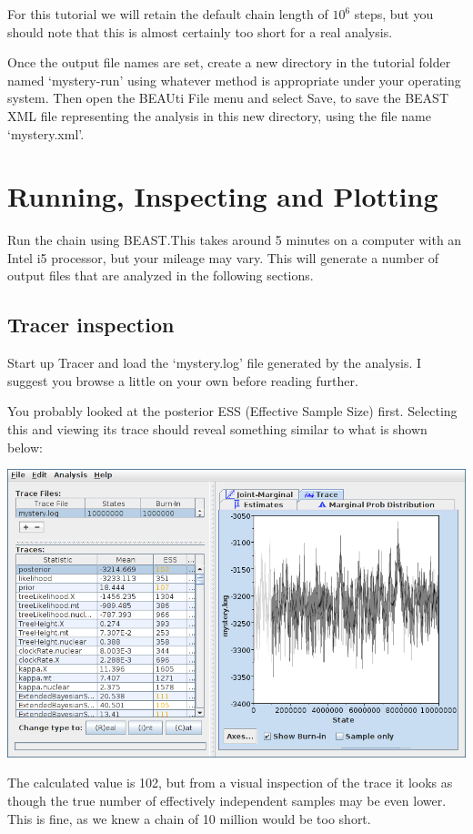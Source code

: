 \documentclass[a4paper,11pt]{article}
\begin{document}
For this tutorial we will retain the default chain length of $10^6$ steps, but
you should note that this is almost certainly too short for a real analysis.


Once the output file names are set, create a new directory in the tutorial
folder named `mystery-run' using whatever method is appropriate under your
operating system.  Then open the BEAUti File menu and select Save, to save the
BEAST XML file representing the analysis in this new directory, using the file
name `mystery.xml'.

\section{Running, Inspecting and Plotting}

Run the chain using BEAST.\@ This takes around 5 minutes on a computer with an
Intel i5 processor, but your mileage may vary. This will generate a number of
output files that are analyzed in the following sections.

\subsection{Tracer inspection}

Start up Tracer and load the `mystery.log' file generated by the analysis.  I
suggest you browse a little on your own before reading further.

You probably looked at the posterior ESS (Effective Sample Size) first.
Selecting this and viewing its trace should reveal something similar to what is
shown below:

\includegraphics[width=\textwidth]{figures/tracer1.png}

The calculated value is 102, but from a visual inspection of the trace it looks
as though the true number of effectively independent samples may be even lower.
This is fine, as we knew a chain of 10 million would be too short.
\end{document}
